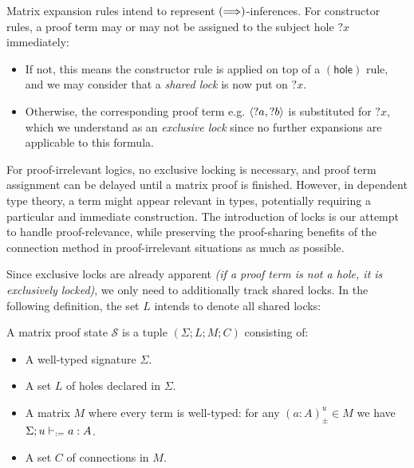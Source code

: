 \documentclass[twoside]{report}
\begin{document}
Matrix expansion rules intend to represent $(\Longrightarrow)$-inferences. For constructor rules, a proof term may or may not be assigned to the subject hole ${?x}$ immediately:
\begin{itemize}
    \item If not, this means the constructor rule is applied on top of a $(\mathsf{hole})$ rule, and we may consider that a \emph{shared lock} is now put on ${?x}$.

    \item Otherwise, the corresponding proof term e.g. $\langle{?a}, {?b}\rangle$ is substituted for ${?x}$, which we understand as an \emph{exclusive lock} since no further expansions are applicable to this formula.
\end{itemize}

For proof-irrelevant logics, no exclusive locking is necessary, and proof term assignment can be delayed until a matrix proof is finished. However, in dependent type theory, a term might appear relevant in types, potentially requiring a particular and immediate construction. The introduction of locks is our attempt to handle proof-relevance, while preserving the proof-sharing benefits of the connection method in proof-irrelevant situations as much as possible.

Since exclusive locks are already apparent \emph{(if a proof term is not a hole, it is exclusively locked)}, we only need to additionally track shared locks. In the following definition, the set $L$ intends to denote all shared locks:

\begin{definition}
    \label{def:matrix_states}
    A matrix proof state $\mathcal S$ is a tuple $(\Sigma; L; M; C)$ consisting of:
    \begin{itemize}[noitemsep]
        \item A well-typed signature $\Sigma$.
        \item A set $L$ of holes declared in $\Sigma$.
        \item A matrix $M$ where every term is well-typed: for any $(a : A)^u_{\pm} \in M$ we have $\Sigma; u \vdash_{:=} a : A$.
        \item A set $C$ of connections in $M$.
    \end{itemize}
\end{definition}
\end{document}
